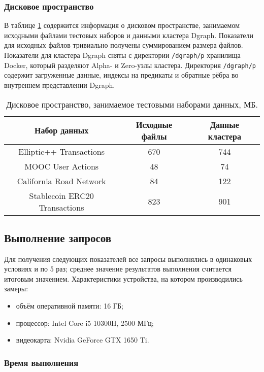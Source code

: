\subsubsection{Дисковое пространство}

В таблице \ref{table:datasetsMemory} содержится информация о дисковом пространстве, занимаемом исходными файлами
тестовых наборов и данными кластера Dgraph. Показатели для исходных файлов тривиально получены суммированием размера
файлов. Показатели для кластера Dgraph сняты с директории \texttt{/dgraph/p} хранилища Docker, который разделяют
Alpha- и Zero-узлы кластера. Директория \texttt{/dgraph/p} содержит загруженные данные, индексы на предикаты и обратные
рёбра во внутреннем представлении Dgraph.

\begin{table}[!htb]
\caption{\centering Дисковое пространство, занимаемое тестовыми наборами данных, МБ.}
\small
\centering\begin{tabular}{||c||c|c||}
\hline\hline
Набор данных & Исходные файлы & Данные кластера \\
\hline\hline
Elliptic++ Transactions & 670 & 744 \\
\hline
MOOC User Actions & 48 & 74 \\
\hline
California Road Network & 84 & 122 \\
\hline
Stablecoin ERC20 Transactions & 823 & 901 \\
\hline\hline
\end{tabular}
\label{table:datasetsMemory}
\end{table}

\subsection{Выполнение запросов}

Для получения следующих показателей все запросы выполнялись в одинаковых условиях и по 5 раз; среднее значение
результатов выполнения считается итоговым значением. Характеристики устройства, на котором производились замеры:
\begin{itemize}
  \item объём оперативной памяти: 16 ГБ;
  \item процессор: Intel Core i5 10300H, 2500 МГц;
  \item видеокарта: Nvidia GeForce GTX 1650 Ti.
\end{itemize}

\subsubsection{Время выполнения}

